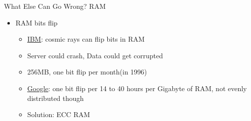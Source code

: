 \documentclass{beamer}
\begin{document}
\begin{frame}{What Else Can Go Wrong? RAM}
\begin{itemize}
\item RAM bits flip
\begin{itemize}
	\item \underline{\textcolor{red}{\href{https://en.wikipedia.org/wiki/Soft_error\#Cosmic_rays_creating_energetic_neutrons_and_protons}{IBM}}}: cosmic rays can flip bits in RAM
	\item Server could crash, Data could get corrupted
	\item 256MB, one bit flip per month(in 1996)
	\item \underline{\textcolor{red}{\href{https://www.intelligentmemory.com/support/faq/ecc-dram/how-often-do-ecc-correctable-single-bit-errors-occur-and-how-about-double-multi-bit-errors.php}{Google}}}: one bit flip per 14 to 40 hours per Gigabyte of RAM, not evenly distributed though
	\item Solution: ECC RAM
\end{itemize}
\end{itemize}
\end{frame}
\end{document}
